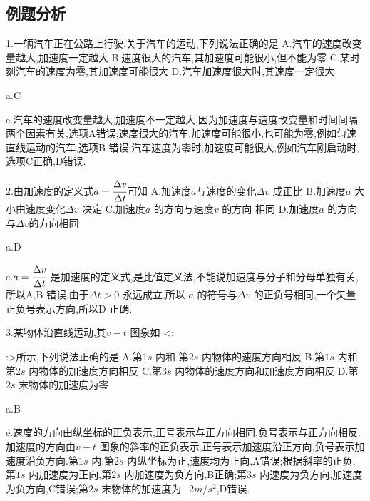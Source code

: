 \subsection{例题分析}
\begin{selection}
  1.一辆汽车正在公路上行驶,关于汽车的运动,下列说法正确的是
  A.汽车的速度改变量越大,加速度一定越大
  B.速度很大的汽车,其加速度可能很小,但不能为零
  C.某时刻汽车的速度为零,其加速度可能很大
  D.汽车加速度很大时,其速度一定很大

  a.C

  e.汽车的速度改变量越大,加速度不一定越大,因为加速度与速度改变量和时间间隔两个因素有关,选项A错误;速度很大的汽车,加速度可能很小,也可能为零,例如匀速直线运动的汽车,选项B 错误;汽车速度为零时,加速度可能很大,例如汽车刚启动时,选项C正确,D错误.

  2.由加速度的定义式$a=\cfrac{\Delta v}{\Delta t}$可知
  A.加速度$a$与速度的变化$\Delta v$ 成正比
  B.加速度$a$ 大小由速度变化$\Delta v$ 决定
  C.加速度$a$ 的方向与速度$v$ 的方向 相同
  D.加速度$a$ 的方向与$\Delta v$的方向相同

  a.D

  e.$a=\cfrac{\Delta v}{\Delta t} $ 是加速度的定义式,是比值定义法,不能说加速度与分子和分母单独有关,所以A,B 错误.由于$\Delta t>0$ 永远成立,所以 $a$ 的符号与$\Delta v$ 的正负号相同,一个矢量正负号表示方向,所以D 正确.

  3.某物体沿直线运动,其$v-t$ 图象如
  <:
  :>所示,下列说法正确的是
  A.第$1s$ 内和 第$2s$ 内物体的速度方向相反
  B.第$1s$ 内和第$2s$ 内物体的加速度方向相反
  C.第$3s$ 内物体的速度方向和加速度方向相反
  D.第$2s$ 末物体的加速度为零

  a.B

  e.速度的方向由纵坐标的正负表示,正号表示与正方向相同,负号表示与正方向相反.加速度的方向由$v-t$ 图象的斜率的正负表示,正号表示加速度沿正方向,负号表示加速度沿负方向.第$1s$ 内,第$2s$ 内纵坐标为正,速度均为正向,A错误;根据斜率的正负,第$1s$ 内加速度为正向,第$2s$ 内加速度为负方向,B正确;第$3s$ 内速度为负方向,加速度为负方向,C错误;第$2s$ 末物体的加速度为$-2m/s^2$,D错误.

\end{selection}
